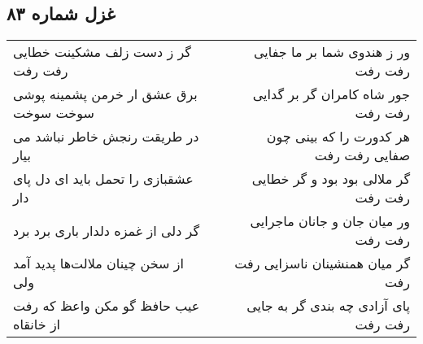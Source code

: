 \begin{center}
\section*{غزل شماره ۸۳}
\label{sec:sh083}
\begin{longtable}{l p{0.5cm} r}
گر ز دست زلف مشکینت خطایی رفت رفت
&&
ور ز هندوی شما بر ما جفایی رفت رفت
\\
برق عشق ار خرمن پشمینه پوشی سوخت سوخت
&&
جور شاه کامران گر بر گدایی رفت رفت
\\
در طریقت رنجش خاطر نباشد می بیار
&&
هر کدورت را که بینی چون صفایی رفت رفت
\\
عشقبازی را تحمل باید ای دل پای دار
&&
گر ملالی بود بود و گر خطایی رفت رفت
\\
گر دلی از غمزه دلدار باری برد برد
&&
ور میان جان و جانان ماجرایی رفت رفت
\\
از سخن چینان ملالت‌ها پدید آمد ولی
&&
گر میان همنشینان ناسزایی رفت رفت
\\
عیب حافظ گو مکن واعظ که رفت از خانقاه
&&
پای آزادی چه بندی گر به جایی رفت رفت
\\
\end{longtable}
\end{center}
